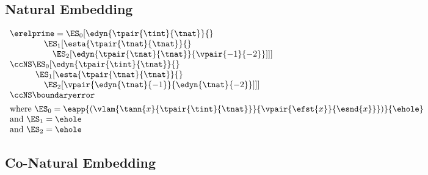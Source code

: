 \subsection{Natural Embedding}

$\begin{array}{l}
  \erelprime = \ES_0[\edyn{\tpair{\tint}{\tnat}}{}
\\\qquad\quad\quad \ES_1[\esta{\tpair{\tnat}{\tnat}}{}
\\\qquad\quad\quad\quad\ES_2[\edyn{\tpair{\tnat}{\tnat}}{\vpair{-1}{-2}}]]]
\\\ccNS \ES_0[\edyn{\tpair{\tint}{\tnat}}{}
\\\qquad\quad \ES_1[\esta{\tpair{\tnat}{\tnat}}{}
\\\qquad\quad\quad \ES_2[\vpair{\edyn{\tnat}{{-1}}}{\edyn{\tnat}{{-2}}}]]]
\\\ccNS \boundaryerror
\\[1ex]
  \mbox{where } \ES_0 = \eapp{(\vlam{\tann{x}{\tpair{\tint}{\tnat}}}{\vpair{\efst{x}}{\esnd{x}}})}{\ehole}
\\\mbox{and } \ES_1 = \ehole
\\\mbox{and } \ES_2 = \ehole
\end{array}$


\subsection{Co-Natural Embedding}

